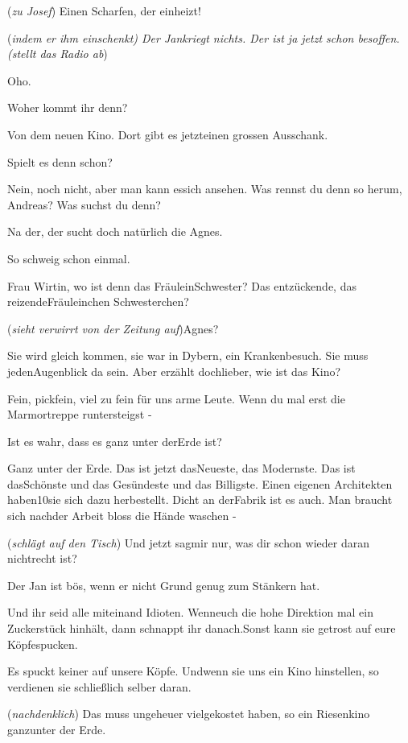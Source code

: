 \documentclass[
	final,
	a4paper,
	ngerman,
	mpinclude = true, %
	twoside = true,
	open = right,
	cleardoublepage = plain,
	DIV = 13,
	BCOR = 1cm,
	titlepage = firstiscover,
	]{scrbook}
\newcommand{\direction}[1]{(\textit{#1})}
\newcommand{\thecharacter}[1]{\textup{\textsc{#1}}\xspace}
\newcommand{\theBarbara}{\thecharacter{Barbara}}
\newcommand{\theJosef}{\thecharacter{Josef}}
\newcommand{\theGregor}{\thecharacter{Gregor}}
\newcommand{\theJan}{\thecharacter{Jan}}
\newcommand{\theAndreas}{\thecharacter{Andreas}}
\newcommand{\theLuise}{\thecharacter{Luise}}
\newcommand{\character}[1]{\item[#1]}
\newcommand{\Barbara}{\character{\theBarbara}}
\newcommand{\Josef}{\character{\theJosef}}
\newcommand{\Gregor}{\character{\theGregor}}
\newcommand{\Jan}{\character{\theJan}}
\newcommand{\Andreas}{\character{\theAndreas}}
\newcommand{\Luise}{\character{\theLuise}}
\begin{document}
\begin{play}
\Gregor
\direction{zu Josef} Einen Scharfen, der einheizt!

\Josef
\direction{indem er ihm einschenkt) Der Jankriegt nichts. Der ist ja jetzt schon besoffen. (stellt das Radio ab}

\Jan
Oho.

\Josef
Woher kommt ihr denn?

\Gregor
Von dem neuen Kino. Dort gibt es jetzteinen grossen Ausschank.

\Josef
Spielt es denn schon?

\Gregor
Nein, noch nicht, aber man kann essich ansehen. Was rennst du denn so herum, Andreas? Was suchst du denn?

\Jan
Na der, der sucht doch natürlich die Agnes.

\Andreas
So schweig schon einmal.

\Jan
Frau Wirtin, wo ist denn das FräuleinSchwester? Das entzückende, das reizendeFräuleinchen Schwesterchen?

\Barbara
\direction{sieht verwirrt von der Zeitung auf}Agnes?

\Josef
Sie wird gleich kommen, sie war in Dybern, ein Krankenbesuch. Sie muss jedenAugenblick da sein. Aber erzählt dochlieber, wie ist das Kino?

\Jan
Fein, pickfein, viel zu fein für uns arme Leute. Wenn du mal erst die Marmortreppe runtersteigst -

\Josef
Ist es wahr, dass es ganz unter derErde ist?

\Jan
Ganz unter der Erde. Das ist jetzt dasNeueste, das Modernste. Das ist dasSchönste und das Gesündeste und das Billigste. Einen eigenen Architekten haben10sie sich dazu herbestellt. Dicht an derFabrik ist es auch. Man braucht sich nachder Arbeit bloss die Hände waschen -

\Gregor
\direction{schlägt auf den Tisch} Und jetzt sagmir nur, was dir schon wieder daran nichtrecht ist?

\Josef
Der Jan ist bös, wenn er nicht Grund genug zum Stänkern hat.

\Jan
Und ihr seid alle miteinand Idioten. Wenneuch die hohe Direktion mal ein Zuckerstück hinhält, dann schnappt ihr danach.Sonst kann sie getrost auf eure Köpfespucken.

\Gregor
Es spuckt keiner auf unsere Köpfe. Undwenn sie uns ein Kino hinstellen, so verdienen sie schließlich selber daran.

\Luise
\direction{nachdenklich} Das muss ungeheuer vielgekostet haben, so ein Riesenkino ganzunter der Erde.


\end{play}
\end{document}
